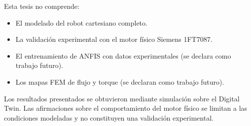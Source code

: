 Esta tesis no comprende:

\begin{itemize}
  \item El modelado del robot cartesiano completo.
  
  \item La validación experimental con el motor físico Siemens 1FT7087.
  
  \item El entrenamiento de ANFIS con datos experimentales (se declara como trabajo futuro).
  
  \item Los mapas FEM de flujo y torque (se declaran como trabajo futuro).
\end{itemize}

Los resultados presentados se obtuvieron mediante simulación sobre el Digital Twin. Las afirmaciones sobre el comportamiento del motor físico se limitan a las condiciones modeladas y no constituyen una validación experimental.

